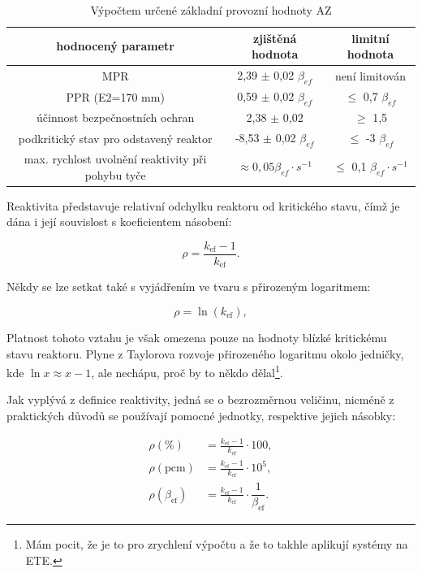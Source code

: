 \begin{table}[!hb]
  \centering
  \caption{Výpočtem určené základní provozní hodnoty AZ}
  \begin{tabular}{c c c}
    \toprule
     hodnocený parametr & zjištěná hodnota & limitní hodnota\\
    \midrule
    MPR & 2,39 $\pm$ 0,02 $\beta_{ef}$ & není limitován\\
    PPR (E2=170 mm) & 0,59 $\pm$ 0,02 $\beta_{ef}$ & $\leq$ 0,7 $\beta_{ef}$\\
    účinnost bezpečnostních ochran & 2,38 $\pm$ 0,02
    & $\geq$ 1,5\\
    podkritický stav pro odstavený reaktor & -8,53 $\pm$ 0,02 $\beta_{ef}$ & $\leq$ -3 $\beta_{ef}$\\
    max. rychlost uvolnění reaktivity při pohybu tyče & $\approx 0,05 \beta_{ef} \cdot s^{-1}$ & $\leq$ 0,1 $\beta_{ef} \cdot s^{-1}$\\
    \bottomrule
  \end{tabular}
  \label{tab:VýsledkyzKEX}
\end{table}
\newpage
Reaktivita představuje relativní odchylku reaktoru od kritického stavu, čímž je dána i její souvislost s koeficientem násobení:

\begin{equation}
    \boxed{\rho = \frac{k_{\text{ef}} - 1}{k_{\text{ef}}}.}
\end{equation}

Někdy se lze setkat také s vyjádřením ve tvaru s přirozeným logaritmem:

\begin{equation}
    \rho = \ln(k_{\text{ef}}),
\end{equation}

Platnost tohoto vztahu je však omezena pouze na hodnoty blízké kritickému stavu reaktoru. Plyne z Taylorova rozvoje přirozeného logaritmu okolo jedničky, kde $\ln{x} \approx x - 1$, ale nechápu, proč by to někdo dělal\footnote{Mám pocit, že je to pro zrychlení výpočtu a že to takhle aplikují systémy na ETE.}.

Jak vyplývá z definice reaktivity, jedná se o bezrozměrnou veličinu, nicméně z praktických důvodů se používají pomocné jednotky, respektive jejich násobky:

\begin{align*}
    \rho (\%) &= \frac{k_{\text{ef}} - 1}{k_{\text{ef}}} \cdot 100, \\
    \rho (\text{pcm}) &= \frac{k_{\text{ef}} - 1}{k_{\text{ef}}} \cdot 10^5, \\
    \rho (\beta_{\text{ef}}) &= \frac{k_{\text{ef}} - 1}{k_{\text{ef}}}\cdot \dfrac{1}{\beta_\text{ef}}.
\end{align*}

